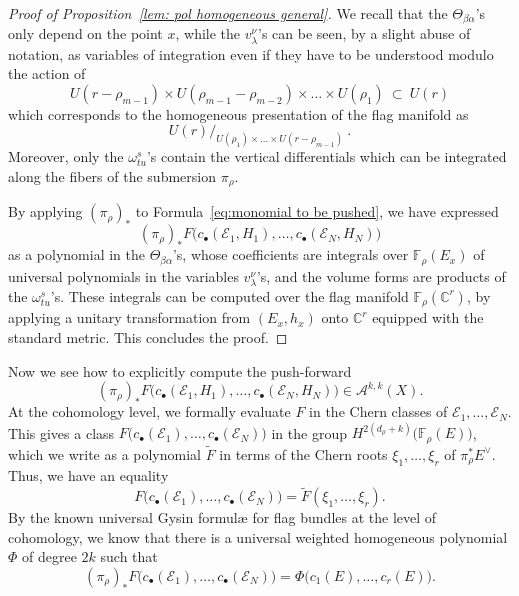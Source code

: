 \documentclass[a4paper]{amsart}
\theoremstyle{plain}%
\theoremstyle{definition}
\theoremstyle{remark}
\newcommand{\C}{\mathbb{C}}
\newcommand{\FF}{\mathbb{F}}
\begin{document}
\begin{proof}[Proof of Proposition~\ref{lem: pol homogeneous general}]
	We recall that the $\Theta_{\beta\alpha}$'s only depend on the point $x$, while the $v_\lambda^\nu$'s can be seen, by a slight abuse of notation, as variables of integration even if they have to be understood modulo the action of
	\[
	U(r - \rho_{m-1}) \times U(\rho_{m-1} - \rho_{m-2}) \times \dots \times U(\rho_{1}) \ \subset \ U(r)
	\]
	which corresponds to the homogeneous presentation of the flag manifold as
	\[
	{\textstyle U(r)}\Big/_{\textstyle U(\rho_{1}) \times \dots \times U(r - \rho_{m-1})} \ .
	\]
	Moreover, only the $ \omega_{tu}^{s} $'s contain the vertical differentials which can be integrated along the fibers of the submersion $ \pi_{\rho} $.
	
	By applying $ (\pi_{\rho})_{*} $ to Formula~\eqref{eq:monomial to be pushed}, we have expressed
	$$ (\pi_{\rho})_{*} F\bigl(c_{\bullet}(\mathcal{E}_1,H_1),\dots,c_{\bullet}(\mathcal{E}_N,H_N)\bigr) $$
	as a polynomial in the $\Theta_{\beta\alpha}$'s, whose coefficients are integrals over $ \FF_{\rho}(E_x) $ of universal polynomials in the variables $ v_{\lambda}^{\nu} $'s, and the volume forms are products of the $ \omega_{tu}^{s} $'s.
	These integrals can be computed over the flag manifold $ \FF_{\rho}(\C^r) $, by applying a unitary transformation from $ (E_x,h_x) $ onto $ \C^r $ equipped with the standard metric.
	This concludes the proof.
\end{proof}

Now we see how to explicitly compute the push-forward
\begin{equation*}
	(\pi_{\rho})_{*} F\bigl(c_{\bullet}(\mathcal{E}_1,H_1),\dots,c_{\bullet}(\mathcal{E}_N,H_N)\bigr) \in \mathcal{A}^{k,k}(X) .
\end{equation*}
At the cohomology level, we formally evaluate $ F $ in the Chern classes of $ \mathcal{E}_1, \dots, \mathcal{E}_N $.
This gives a class $ F\bigl(c_{\bullet}(\mathcal{E}_1),\dots,c_{\bullet}(\mathcal{E}_N)\bigr) $ in the group $ H^{2(d_\rho + k)}\bigl(\FF_{\rho}(E)\bigr) $, which we write as a polynomial $ \tilde{F} $ in terms of the Chern roots $ \xi_1,\dots,\xi_r $ of $ \pi_{\rho}^{*}{E^{\vee}} $.
Thus, we have an equality
\[
F\bigl(c_{\bullet}(\mathcal{E}_1),\dots,c_{\bullet}(\mathcal{E}_N)\bigr) = \tilde{F}(\xi_{1},\dots,\xi_{r}) .
\]
By the known universal Gysin formul{\ae} for flag bundles at the level of cohomology, we know that there is a universal weighted homogeneous polynomial $ \Phi $ of degree $ 2k $ such that
\begin{equation}\label{eq: push at the class level, general form}
	(\pi_{\rho})_{*} F\bigl(c_{\bullet}(\mathcal{E}_1),\dots,c_{\bullet}(\mathcal{E}_N)\bigr) = \Phi\bigl(c_1(E),\dots,c_r(E)\bigr) .
\end{equation}
\end{document}
